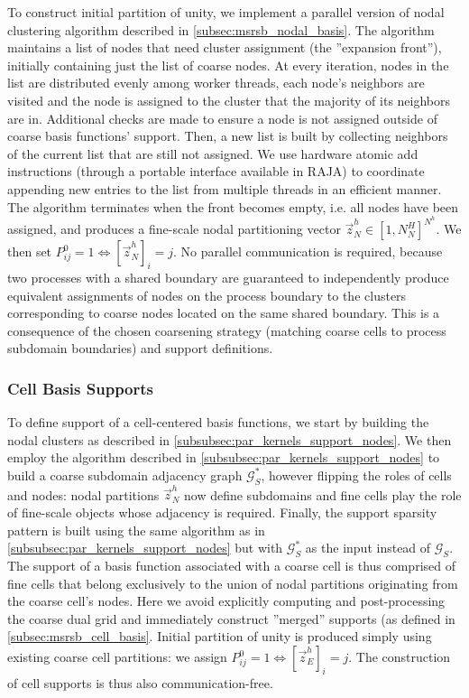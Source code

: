 To construct initial partition of unity, we implement a parallel version of nodal clustering algorithm described in \cref{subsec:msrsb_nodal_basis}.   The algorithm maintains a list of nodes that need cluster assignment (the ''expansion front''), initially containing just the list of coarse nodes.   At every iteration, nodes in the list are distributed evenly among worker threads, each node's neighbors are visited and the node is assigned to the cluster that the majority of its neighbors are in.   Additional checks are made to ensure a node is not assigned outside of coarse basis functions' support.   Then, a new list is built by collecting neighbors of the current list that are still not assigned.   We use hardware atomic add instructions (through a portable interface available in RAJA) to coordinate appending new entries to the list from multiple threads in an efficient manner.   The algorithm terminates when the front becomes empty, i.e. all nodes have been assigned, and produces a fine-scale nodal partitioning vector $\vec{z}_N^h \in [1,N_N^H]^{N^h}$.    We then set $P_{ij}^0 = 1 \Leftrightarrow [\vec{z}_N^h]_i = j$.   No parallel communication is required, because two processes with a shared boundary are guaranteed to independently produce equivalent assignments of nodes on the process boundary to the clusters corresponding to coarse nodes located on the same shared boundary.   This is a consequence of the chosen coarsening strategy (matching coarse cells to process subdomain boundaries) and support definitions.

\subsubsection{Cell Basis Supports}
\label{subsubsec:par_kernels_support_cells}

To define support of a cell-centered basis functions, we start by building the nodal clusters as described in \cref{subsubsec:par_kernels_support_nodes}.   We then employ the algorithm described in \cref{subsubsec:par_kernels_support_nodes} to build a coarse subdomain adjacency graph $\mathcal{G}_S^*$, however flipping the roles of cells and nodes: nodal partitions $\vec{z}_N^h$ now define subdomains and fine cells play the role of fine-scale objects whose adjacency is required.   Finally, the support sparsity pattern is built using the same algorithm as in \cref{subsubsec:par_kernels_support_nodes} but with $\mathcal{G}_S^*$ as the input instead of $\mathcal{G}_S$.   The support of a basis function associated with a coarse cell is thus comprised of fine cells that belong exclusively to the union of nodal partitions originating from the coarse cell's nodes.   Here we avoid explicitly computing and post-processing the coarse dual grid and immediately construct ''merged'' supports (as defined in \cref{subsec:msrsb_cell_basis}.   Initial partition of unity is produced simply using existing coarse cell partitions: we assign $P_{ij}^0 = 1 \Leftrightarrow [\vec{z}_E^h]_i = j$.   The construction of cell supports is thus also communication-free.


